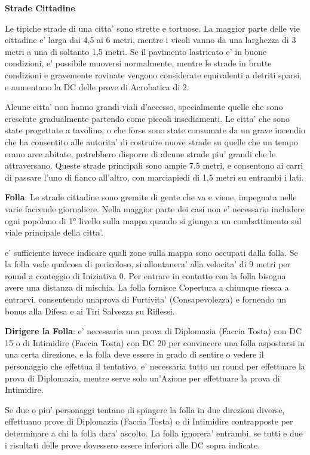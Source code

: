 \documentclass[a4paper,11pt,twoside,openany]{book}
\begin{document}
\textbf{Strade Cittadine}

Le tipiche strade di una citta' sono strette e tortuose. La maggior parte delle vie cittadine e' larga dai 4,5 ai 6 metri, mentre i vicoli vanno da una larghezza di 3 metri a una di soltanto 1,5 metri. Se il pavimento lastricato e' in buone condizioni, e' possibile muoversi normalmente, mentre le strade in brutte condizioni e gravemente rovinate vengono considerate equivalenti a detriti sparsi, e aumentano la DC delle prove di Acrobatica di 2.

Alcune citta' non hanno grandi viali d'accesso, specialmente quelle che sono cresciute gradualmente partendo come piccoli insediamenti. Le citta' che sono state progettate a tavolino, o che forse sono state consumate da un grave incendio che ha consentito alle autorita' di costruire nuove strade su quelle che un tempo erano aree abitate, potrebbero disporre di alcune strade piu' grandi che le attraversano. Queste strade principali sono ampie 7,5 metri, e consentono ai carri di passare l'uno di fianco all'altro, con marciapiedi di 1,5 metri su entrambi i lati.

\textbf{Folla}: Le strade cittadine sono gremite di gente che va e viene, impegnata nelle varie faccende giornaliere. Nella maggior parte dei casi non e' necessario includere ogni popolano di 1° livello sulla mappa quando si giunge a un combattimento sul viale principale della citta'.

e' sufficiente invece indicare quali zone sulla mappa sono occupati dalla folla. Se la folla vede qualcosa di pericoloso, si allontanera' alla velocita' di 9 metri per round a conteggio di Iniziativa 0. Per entrare in contatto con la folla bisogna avere una distanza di mischia. La folla fornisce Copertura a chiunque riesca a entrarvi, consentendo unaprova di Furtivita' (Consapevolezza) e fornendo un bonus alla Difesa e ai Tiri Salvezza su Riflessi.

\textbf{Dirigere la Folla}: e' necessaria una prova di Diplomazia (Faccia Tosta) con DC 15 o di Intimidire (Faccia Tosta) con DC 20 per convincere una folla aspostarsi in una certa direzione, e la folla deve essere in grado di sentire o vedere il personaggio che effettua il tentativo. e' necessaria tutto un round per effettuare la prova di Diplomazia, mentre serve solo un'Azione per effettuare la prova di Intimidire.

Se due o piu' personaggi tentano di spingere la folla in due direzioni diverse, effettuano prove di Diplomazia (Faccia Tosta) o di Intimidire contrapposte per determinare a chi la folla dara' ascolto. La folla ignorera' entrambi, se tutti e due i risultati delle prove dovessero essere inferiori alle DC sopra indicate.
\end{document}

